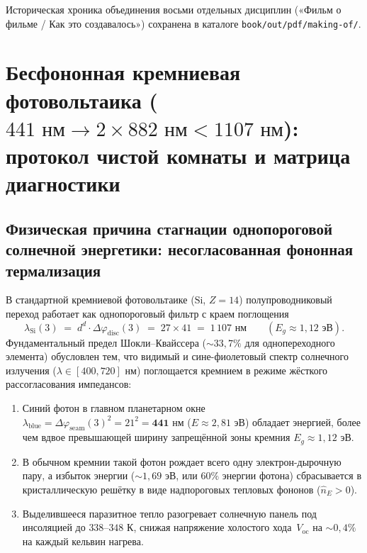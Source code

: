 Историческая хроника объединения восьми отдельных дисциплин («Фильм о фильме / Как это создавалось») сохранена в каталоге \texttt{book/out/pdf/making-of/}.

\chapter{Бесфононная кремниевая фотовольтаика (\texorpdfstring{$441\text{ нм} \to 2\times 882\text{ нм} < 1107\text{ нм}$}{441 nm -> 2 x 882 nm < 1107 nm}): протокол чистой комнаты и матрица диагностики}
\label{ch:lab-solar-photovoltaics}

\section{Физическая причина стагнации однопороговой солнечной энергетики: несогласованная фононная термализация}

В стандартной кремниевой фотовольтаике ($\mathrm{Si}$, $Z = 14$) полупроводниковый переход работает как однопороговый фильтр с краем поглощения
\begin{equation}
  \label{eq:lab-si-bandgap}
  \lambda_{\mathrm{Si}}(3) \;=\; d^d \cdot \Delta\varphi_{\mathrm{disc}}(3) \;=\; 27 \times 41 \;=\; 1\,107\text{ нм} \qquad (E_g \approx 1{,}12\text{ эВ}).
\end{equation}
Фундаментальный предел Шокли--Квайссера ($\sim 33{,}7\%$ для однопереходного элемента) обусловлен тем, что видимый и сине-фиолетовый спектр солнечного излучения ($\lambda \in [400, 720]\text{ нм}$) поглощается кремнием в режиме жёсткого рассогласования импедансов:
\begin{enumerate}[leftmargin=*,noitemsep]
\item Синий фотон в главном планетарном окне $\lambda_{\mathrm{blue}} = \Delta\varphi_{\mathrm{seam}}(3)^2 = 21^2 = \mathbf{441\text{ нм}}$ ($E \approx 2{,}81\text{ эВ}$) обладает энергией, более чем вдвое превышающей ширину запрещённой зоны кремния $E_g \approx 1{,}12\text{ эВ}$.
\item В обычном кремнии такой фотон рождает всего одну электрон-дырочную пару, а избыток энергии ($\sim 1{,}69\text{ эВ}$, или $60\%$ энергии фотона) сбрасывается в кристаллическую решётку в виде надпороговых тепловых фононов ($\hat{n}_E > 0$).
\item Выделившееся паразитное тепло разогревает солнечную панель под инсоляцией до $338\text{--}348\text{ К}$, снижая напряжение холостого хода~$V_{\mathrm{oc}}$ на $\sim 0{,}4\%$ на каждый кельвин нагрева.
\end{enumerate}

